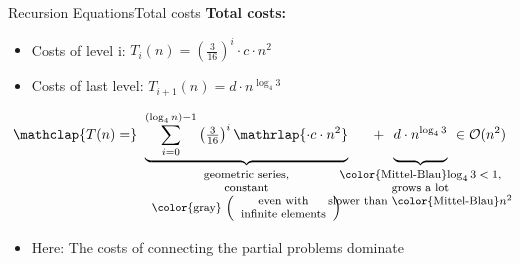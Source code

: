 
\begin{frame}{Recursion Equations}{Total costs}
  \textbf{Total costs:}
  \begin{itemize}
    \item
      Costs of {\color{Mittel-Blau}level i}:
      $T_i(n) = \left(\frac{3}{16}\right)^i \cdot c \cdot n^2$
    \item
      Costs of {\color{Mittel-Blau}last level}:
      $T_{i+1}(n) = d \cdot n^{\log_4 3}$
  \end{itemize}
  \vspace{0.5em}
  \begin{displaymath}
    \mathclap{T(n) =}\underbrace{
      \sum\limits_{i = 0}^{(\log_4 n) - 1} \left(\tfrac{3}{16}\right)^i
      \mathrlap{\cdot c \cdot n^2}
    }_{
      \text{
        \footnotesize
        \begin{tabular}{c}
          geometric series,\\
          constant\\
          \color{gray}
          $\left(\begin{array}{c}
            \text{even with}\\
            \text{infinite elements}
          \end{array}\right)$
        \end{tabular}
      }
    } \hspace{1.25em} + \hspace{0.5em} \underbrace{
      d \cdot n^{\log_4 3}
      \vphantom{\sum\limits_{i = 0}^{(\log_4 n) - 1}}
    }_{
      \text{
        \makebox[0pt][c]{
          \footnotesize
          \begin{tabular}{c}
            {\color{Mittel-Blau}$\log_4 3 < 1$},\\
            grows a lot\\
            slower than {\color{Mittel-Blau}$n^2$}
          \end{tabular}
        }
      }
    } ~ \in \mathcal{O}(n^2)
  \end{displaymath}
  \begin{itemize}
    \item
      Here: The costs of connecting the partial problems dominate
  \end{itemize}
\end{frame}


